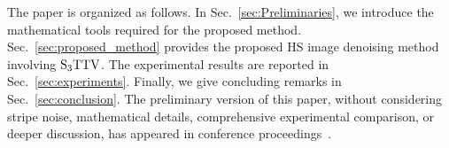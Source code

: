 The paper is organized as follows.
In Sec.~\ref{sec:Preliminaries}, we introduce the mathematical tools required for the proposed method.
Sec.~\ref{sec:proposed_method} provides the proposed HS image denoising method involving ${\text{S}_{3} \text{TTV}}$.
The experimental results are reported in Sec.~\ref{sec:experiments}.
Finally, we give concluding remarks in Sec.~\ref{sec:conclusion}.
The preliminary version of this paper, without considering stripe noise, mathematical details, comprehensive experimental comparison, or deeper discussion, has appeared in conference proceedings~\cite{Takemoto2023S3TTV}.

